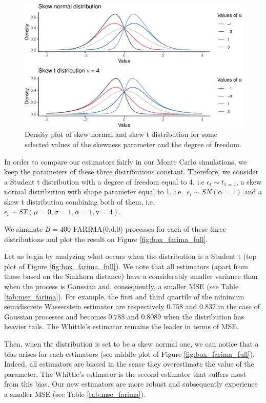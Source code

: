 \documentclass[
  11pt,
]{article}
\begin{document}
\begin{figure}

{\centering \includegraphics[width=0.65\linewidth]{Master_thesis_V4_files/figure-latex/skewt_density-1} 

}

\caption{Density plot of skew normal and skew t distribution for some selected values of the skewness parameter and the degree of freedom.}\label{fig:skewt_density}
\end{figure}

In order to compare our estimators fairly in our Monte Carlo
simulations, we keep the parameters of these three distributions
constant. Therefore, we consider a Student t distribution with a degree
of freedom equal to 4, i.e \(\epsilon_t \sim t_{\mathrm{v} =4}\), a skew
normal distribution with shape parameter equal to 1,
i.e.~\(\epsilon_t \sim SN(\alpha = 1)\) and a skew t distribution
combining both of them,
i.e.~\(\epsilon_t \sim S T(\mu = 0, \sigma = 1, \alpha = 1, \mathrm{v} = 4)\).

We simulate \(B = 400\) FARIMA(0,d,0) processes for each of these three
distributions and plot the result on Figure \ref{fig:box_farima_full}.

Let us begin by analyzing what occurs when the distribution is a Student
t (top plot of Figure \ref{fig:box_farima_full}). We note that all
estimators (apart from those based on the Sinkhorn distance) have a
considerably smaller variance than when the process is Gaussian and,
consequently, a smaller MSE (see Table \ref{tab:mse_farima}). For
example, the first and third quartile of the minimum semidiscrete
Wasserstein estimator are respectively \(0.758\) and \(0.832\) in the
case of Gaussian processes and becomes \(0.788\) and \(0.8089\) when the
distribution has heavier tails. The Whittle's estimator remains the
leader in terms of MSE.

Then, when the distribution is set to be a skew normal one, we can
notice that a bias arises for each estimators (see middle plot of Figure
\ref{fig:box_farima_full}). Indeed, all estimators are biased in the
sense they overestimate the value of the parameter. The Whittle's
estimator is the second estimator that suffers most from this bias. Our
new estimators are more robust and subsequently experience a smaller MSE
(see Table \ref{tab:mse_farima}).
\end{document}
